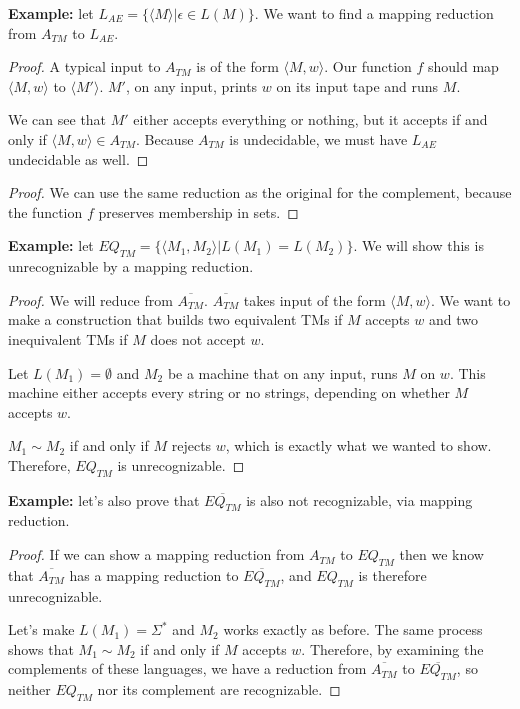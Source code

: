 \textbf{Example:} let $L_{AE} = \{\langle M \rangle | \epsilon\in L(M)\}$.  We want to find a mapping reduction from $A_{TM}$ to $L_{AE}$.  

\begin{proof} 
	A typical input to $A_{TM}$ is of the form $\langle M,w\rangle$.  Our function $f$ should map $\langle M,w\rangle$ to $\langle M' \rangle$.  $M'$, on any input, prints $w$ on its input tape and runs $M$.

We can see that $M'$ either accepts everything or nothing, but it accepts if and only if $\langle M,w\rangle\in A_{TM}$.  Because $A_{TM}$ is undecidable, we must have $L_{AE}$ undecidable as well.
\end{proof}


\begin{proof}
	
	We can use the same reduction as the original for the complement, because the function $f$ preserves membership in sets.
	
	
\end{proof}

\textbf{Example:} let $EQ_{TM}=\{\langle M_1,M_2\rangle|L(M_1)=L(M_2)  \}$.  We will show this is unrecognizable by a mapping reduction.


\begin{proof}
We will reduce from $\overline{A_{TM}}$.  $\overline{A_{TM}}$ takes input of the form $\langle M,w\rangle$.  We want to make a construction that builds two equivalent TMs if $M$ accepts $w$ and two inequivalent TMs if $M$ does not accept $w$.

Let $L(M_1) = \emptyset$ and $M_2$ be a machine that on any input, runs $M$ on $w$.  This machine either accepts every string or no strings, depending on whether $M$ accepts $w$.  

$M_1\sim M_2$ if and only if $M$ rejects $w$, which is exactly what we wanted to show.  Therefore, $EQ_{TM}$ is unrecognizable.
\end{proof}

\textbf{Example:} let's also prove that $\overline{EQ_{TM}}$ is also not recognizable, via mapping reduction.  

\begin{proof}
	
If we can show a mapping reduction from $A_{TM}$ to $EQ_{TM}$ then we know that $\overline{A_{TM}}$ has a mapping reduction to $\overline{EQ_{TM}}$, and $EQ_{TM}$ is therefore unrecognizable.

Let's make $L(M_1) = \Sigma^*$ and $M_2$ works exactly as before.  The same process shows that $M_1\sim M_2$ if and only if $M$ accepts $w$.  Therefore, by examining the complements of these languages, we have a reduction from $\overline{A_{TM}}$ to $\overline{EQ_{TM}}$, so neither $EQ_{TM}$ nor its complement are recognizable.
\end{proof}

